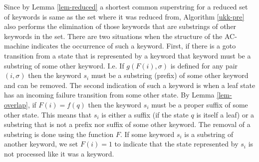 \documentclass[english,twoside,censored,csm,algorithms-track-2020]{HYthesisML}
\theoremstyle{plain}
\theoremstyle{definition}
\begin{document}
Since by Lemma \ref{lem-reduced} a shortest common superstring for a reduced set of keywords
is same as the set where it was reduced from, Algorithm \ref{ukk-pre} also performs
the elimination of those keywords that are substrings of other keywords in the set. There are two
situations when the structure of the AC-machine indicates the occurrence of such a keyword. First,
if there is a goto transition from a state that is represented by a keyword that keyword
must be a substring of some other keyword. I.e. If $g(F(i),\sigma)$ is defined for any pair
$(i,\sigma)$ then the keyword $s_i$ must be a substring (prefix)  of some other keyword and can be
removed. The second indication of such a keyword is when a leaf state has an incoming failure
transition from some other state. By Lemma \ref{lem-overlap}, if $F(i) = f(q)$ then the keyword
$s_i$ must be a proper suffix of some other state. This means that $s_i$ is either a suffix
(if the state $q$ is itself a leaf) or a substring that is not a prefix nor suffix of some other
keyword. The removal of a substring is done using the function $F$. If some keyword
$s_i$ is a substring of another keyword, we set $F(i)=1$ to indicate that the state represented
by $s_i$ is not processed like it was a keyword.
\end{document}
